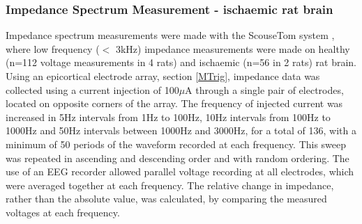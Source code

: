 \subsubsection{Impedance Spectrum Measurement - ischaemic rat brain}

Impedance spectrum measurements were made with the ScouseTom system \cite{Dowrick_2015}, where low frequency ($<$ 3kHz) impedance measurements were made on healthy (n=112 voltage measurements in 4 rats) and ischaemic (n=56 in 2 rats) rat brain. Using an epicortical electrode array, section \ref{MTrig}, impedance data was collected using a current injection of 100$\mu$A through a single pair of electrodes, located on opposite corners of the array. The frequency of injected current was increased in 5Hz intervals from 1Hz to 100Hz, 10Hz intervals from 100Hz to 1000Hz and 50Hz intervals between 1000Hz and 3000Hz, for a total of 136, with a minimum of 50 periods of the waveform recorded at each frequency. This sweep was repeated in ascending and descending order and with random ordering. The use of an EEG recorder allowed parallel voltage recording at all electrodes, which were averaged together at each frequency. The relative change in impedance, rather than the absolute value, was calculated, by comparing the measured voltages at each frequency.